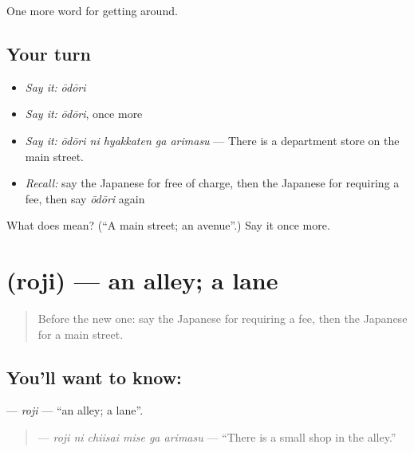 \begin{grammarlens}[title={What you've built}]
One more word for getting around.
\end{grammarlens}

\subsection*{Your turn}
\begin{itemize}
\raggedright
  \item \emph{Say it:} \emph{ōdōri}
  \item \emph{Say it:} \emph{ōdōri}, once more
  \item \emph{Say it:} \emph{ōdōri ni hyakkaten ga arimasu} — There is a department store on the main street.
  \item \emph{Recall:} say the Japanese for free of charge, then the Japanese for requiring a fee, then say \emph{ōdōri} again
\end{itemize}

\begin{tcolorbox}[breakable,colback=teal!4,colframe=teal!35!black,title={Before you move on}]
What does  mean? (\textquotedblleft{}A main street; an avenue\textquotedblright{}.) Say it once more.
\end{tcolorbox}
\section[\texorpdfstring{\ja{ろじ} (roji)}{ろじ (roji)}]{ (roji) — an alley; a lane}

\label{lesson:JA-C389-roji}



\begin{quote}
Before the new one: say the Japanese for requiring a fee, then the Japanese for a main street.
\end{quote}

\subsection*{You'll want to know: }
\textbf{} — \emph{roji} — \textquotedblleft{}an alley; a lane\textquotedblright{}.

\begin{quote}
\textbf{   } — \emph{roji ni chiisai mise ga arimasu} — \textquotedblleft{}There is a small shop in the alley.\textquotedblright{}
\end{quote}

